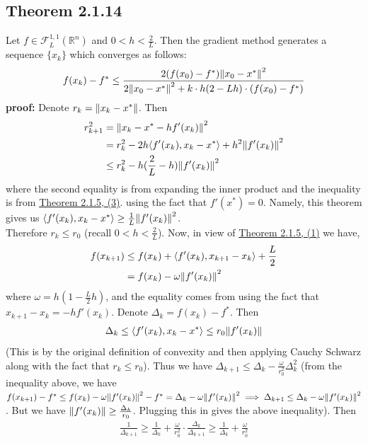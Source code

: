 \documentclass[12pt,a4paper]{article}
\begin{document}
	 \subsection*{Theorem 2.1.14}\label{thm2114}
	 Let $f \in \mathcal{F}_L^{1,1}(\mathbb{R}^n)$ and $0 < h < \frac{2}{L}$. Then the gradient method generates a sequence $\{x_k\}$ which converges as follows:
	 \begin{align*}
	 	f(x_k) - f^* \leq \frac{2(f(x_0) - f^*)\norm{x_0 - x^*}^2}{2\norm{x_0 - x^*}^2 + k \cdot h(2 - Lh)\cdot (f(x_0) - f^*)}
	 \end{align*}
	 \textbf{proof:} Denote $r_k = \norm{x_k - x^*}$. Then
	 \begin{align*}
	 	r_{k+1}^2 &= \norm{x_k - x^* - hf'(x_k)}^2 \\
	 	&= r_k^2 - 2h \langle f'(x_k), x_k - x^* \rangle + h^2 \norm{f'(x_k)}^2 \\
	 	&\leq r_k^2 - h(\frac{2}{L} - h)\norm{f'(x_k)}^2
	 \end{align*}
	 where the second equality is from expanding the inner product and the inequality is from \hyperref[thm215]{Theorem 2.1.5, (3)}. using the fact that $f'(x^*) = 0$. Namely, this theorem gives us $\langle f'(x_k), x_k - x^* \rangle \geq \frac{1}{L}\norm{f'(x_k)}^2$.\\
	 Therefore $r_k \leq r_0$ (recall $0 < h < \frac{2}{L}$). Now, in view of \hyperref[thm215]{Theorem 2.1.5, (1)} we have,
	 \begin{align*}
	 	f(x_{k+1}) &\leq f(x_k) + \langle f'(x_k), x_{k+1} - x_k \rangle + \frac{L}{2} \\
	 	&= f(x_k) - \omega \norm{f'(x_k)}^2
	 \end{align*} 
	 where $\omega = h(1 - \frac{L}{2}h)$, and the equality comes from using the fact that $x_{k+1} - x_k = -hf'(x_k)$. Denote $\Delta_k = f(x_k) - f^*$. Then
	 \begin{align*}
	 	\Delta_k \leq \langle f'(x_k), x_k - x^* \rangle \leq r_0 \norm{f'(x_k)}
	 \end{align*}
	 (This is by the original definition of convexity and then applying Cauchy Schwarz along with the fact that $r_k \leq r_0$). Thus we have $\Delta_{k+1} \leq \Delta_k - \frac{\omega}{r_0^2}\Delta_k^2$ (from the inequality above, we have $f(x_{k+1}) - f^* \leq f(x_k) - \omega\norm{f'(x_k)}^2 - f^* = \Delta_k - \omega\norm{f'(x_k)}^2 \implies \Delta_{k+1} \leq \Delta_k - \omega\norm{f'(x_k)}^2$. But we have $\norm{f'(x_k)} \geq \frac{\Delta_k}{r_0}$. Plugging this in gives the above inequality). Then
	 \begin{align*}
	 	\frac{1}{\Delta_{k+1}} \geq \frac{1}{\Delta_k} + \frac{\omega}{r_0^2}\cdot \frac{\Delta_k}{\Delta_{k+1}} \geq \frac{1}{\Delta_k} + \frac{\omega}{r_0^2}
	 \end{align*}
\end{document}
